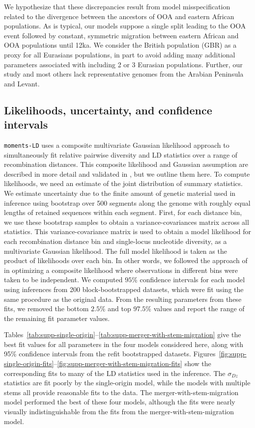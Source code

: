 \documentclass[]{article}
\begin{document}
We hypothesize that these discrepancies result from model misspecification
related to the divergence between the ancestors of OOA and eastern African
populations. As is typical, our models suppose a single split leading to the
OOA event followed by constant, symmetric migration between eastern African and
OOA populations until 12ka. We consider the British population (GBR) as a proxy
for all Eurasians populations, in part to avoid adding many additional
parameters associated with including 2 or 3 Eurasian populations. Further, our
study and most others lack representative genomes from the Arabian Peninsula
and Levant. 

\subsection{Likelihoods, uncertainty, and confidence intervals}
\label{sec:likelihoods-uncertainty}

\texttt{moments-LD} uses a composite multivariate Gaussian likelihood approach
to simultaneously fit relative pairwise diversity and LD statistics over a
range of recombination distances. This composite likelihood and Gaussian
assumption are described in more detail and validated in
\citet{Ragsdale2019-nt}, but we outline them here. To compute likelihoods, we
need an estimate of the joint distribution of summary statistics. We estimate
uncertainty due to the finite amount of genetic material used in inference
using bootstrap over 500 segments along the genome with roughly equal lengths
of retained sequences within each segment. First, for each distance bin, we use
these bootstrap samples to obtain a variance-covariances matrix across all
statistics. This variance-covariance matrix is used to obtain a model
likelihood for each recombination distance bin and single-locus nucleotide
diversity, as a multivariate Gaussian likelihood. The full model likelihood is
taken as the product of likelihoods over each bin. In other words, we followed
the approach of \citet{Ragsdale2019-nt} in optimizing a composite likelihood
where observations in different bins were taken to be independent. We computed
$95\%$ confidence intervals for each model using inferences from 200
block-bootstrapped datasets, which were fit using the same procedure as the
original data. From the resulting parameters from these fits, we removed the
bottom $2.5\%$ and top $97.5\%$ values and report the range of the remaining
fit parameter values.

Tables~\ref{tab:supp-single-origin}--\ref{tab:supp-merger-with-stem-migration}
give the best fit values for all parameters in the four models considered here,
along with 95\% confidence intervals from the refit bootstrapped datasets.
Figures~\ref{fig:supp-single-origin-fits}--\ref{fig:supp-merger-with-stem-migration-fits}
show the corresponding fits to many of the LD statistics used in the inference.
The $\sigma_{Dz}$ statistics are fit poorly by the single-origin model, while
the models with multiple stems all provide reasonable fits to the data. The
merger-with-stem-migration model performed the best of these four models,
although the fits were nearly visually indistinguishable from the fits from the
merger-with-stem-migration model.
\end{document}
